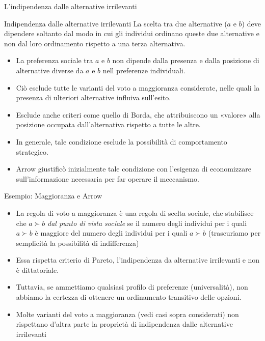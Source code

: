 \documentclass[11pt]{beamer}
\begin{document}
\begin{frame}{L'indipendenza dalle alternative irrilevanti}
\begin{block}{Indipendenza dalle alternative irrilevanti}
La scelta tra due alternative ($a$ e $b$) deve dipendere \alert{soltanto} dal modo
in cui gli individui ordinano queste due alternative e non dal loro
ordinamento rispetto a una terza alternativa.
\end{block}

\begin{itemize}
\item La preferenza sociale tra $a$ e $b$ non dipende dalla presenza e dalla
posizione di alternative diverse da $a$ e $b$ nell preferenze individuali.
\item Ciò esclude tutte le varianti del voto a maggioranza considerate, nelle
quali la presenza di ulteriori alternative influiva sull'esito.
\item Esclude anche criteri come quello di Borda, che attribuiscono un «valore»
alla posizione occupata dall'alternativa rispetto a tutte le altre.
\item In generale, tale condizione esclude la possibilità di comportamento
strategico.
\item Arrow giustificò inizialmente tale condizione con l'esigenza di economizzare
sull'informazione necessaria per far operare il meccanismo.
\end{itemize}
\end{frame}

\begin{frame}{Esempio: Maggioranza e Arrow}
\begin{itemize}
\item La regola di voto a maggioranza è una regola di scelta sociale, che
stabilisce che $a\succ b$ \emph{dal punto di vista sociale} se il numero degli
individui per i quali $a\succ b$ è maggiore del numero degli individui per i
quali $a\succ b$ (trascuriamo per semplicità la possibilità di indifferenza)
\item Essa rispetta criterio di Pareto, l'indipendenza da alternative irrilevanti
e non è dittatoriale.
\item Tuttavia, se ammettiamo qualsiasi profilo di preferenze (universalità), non
abbiamo la certezza di ottenere un ordinamento transitivo delle opzioni.
\item Molte varianti del voto a maggioranza (vedi casi sopra considerati) non
rispettano d'altra parte la proprietà di indipendenza dalle alternative
irrilevanti
\end{itemize}
\end{frame}
\end{document}
